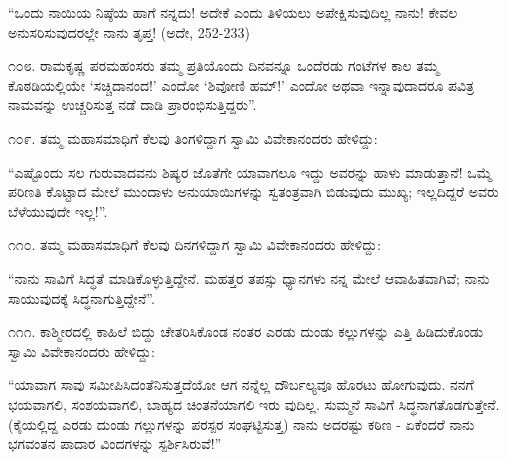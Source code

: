 “ಒಂದು ನಾಯಿಯ ನಿಷ್ಠೆಯ ಹಾಗೆ ನನ್ನದು! ಅದೇಕೆ ಎಂದು ತಿಳಿಯಲು ಅಪೇಕ್ಷಿಸುವುದಿಲ್ಲ ನಾನು! ಕೇವಲ ಅನುಸರಿಸುವುದರಲ್ಲೇ ನಾನು ತೃಪ್ತ! (ಅದೇ, 252-233)

೧೦೮. ರಾಮಕೃಷ್ಣ ಪರಮಹಂಸರು ತಮ್ಮ ಪ್ರತಿಯೊಂದು ದಿನವನ್ನೂ ಒಂದೆರಡು ಗಂಟೆಗಳ ಕಾಲ ತಮ್ಮ ಕೊಠಡಿಯಲ್ಲಿಯೇ ‘ಸಚ್ಚಿದಾನಂದ!’ ಎಂದೋ ‘ಶಿವೋಣಿ ಹಮ್​!’ ಎಂದೋ ಅಥವಾ ಇನ್ನಾವುದಾದರೂ ಪವಿತ್ರ ನಾಮವನ್ನು ಉಚ್ಚರಿಸುತ್ತ ನಡೆ ದಾಡಿ ಪ್ರಾರಂಭಿಸುತ್ತಿದ್ದರು”. 

೧೦೯. ತಮ್ಮ ಮಹಾಸಮಾಧಿಗೆ ಕೆಲವು ತಿಂಗಳಿದ್ದಾಗ ಸ್ವಾಮಿ ವಿವೇಕಾನಂದರು ಹೇಳಿದ್ದು:

“ಎಷ್ಟೊಂದು ಸಲ ಗುರುವಾದವನು ಶಿಷ್ಯರ ಜೊತೆಗೇ ಯಾವಾಗಲೂ ಇದ್ದು ಅವರನ್ನು ಹಾಳು ಮಾಡುತ್ತಾನೆ! ಒಮ್ಮೆ ಪರಿಣತಿ ಕೊಟ್ಟಾದ ಮೇಲೆ ಮುಂದಾಳು ಅನುಯಾಯಿಗಳನ್ನು ಸ್ವತಂತ್ರವಾಗಿ ಬಿಡುವುದು ಮುಖ್ಯ; ಇಲ್ಲದಿದ್ದರೆ ಅವರು ಬೆಳೆಯುವುದೇ ಇಲ್ಲ!”. 

೧೧೦. ತಮ್ಮ ಮಹಾಸಮಾಧಿಗೆ ಕೆಲವು ದಿನಗಳಿದ್ದಾಗ ಸ್ವಾಮಿ ವಿವೇಕಾನಂದರು ಹೇಳಿದ್ದು:

“ನಾನು ಸಾವಿಗೆ ಸಿದ್ಧತೆ ಮಾಡಿಕೊಳ್ಳುತ್ತಿದ್ದೇನೆ. ಮಹತ್ತರ ತಪಸ್ಸು ಧ್ಯಾನಗಳು ನನ್ನ ಮೇಲೆ ಆವಾಹಿತವಾಗಿವೆ; ನಾನು ಸಾಯುವುದಕ್ಕೆ ಸಿದ್ಧನಾಗುತ್ತಿದ್ದೇನೆ”. 

೧೧೧. ಕಾಶ್ಮೀರದಲ್ಲಿ ಕಾಹಿಲೆ ಬಿದ್ದು ಚೇತರಿಸಿಕೊಂಡ ನಂತರ ಎರಡು ದುಂಡು ಕಲ್ಲುಗಳನ್ನು ಎತ್ತಿ ಹಿಡಿದುಕೊಂಡು ಸ್ವಾಮಿ ವಿವೇಕಾನಂದರು ಹೇಳಿದ್ದು:

“ಯಾವಾಗ ಸಾವು ಸಮೀಪಿಸಿದಂತೆನಿಸುತ್ತದೆಯೋ ಆಗ ನನ್ನೆಲ್ಲ ದೌರ್ಬಲ್ಯವೂ ಹೊರಟು ಹೋಗುವುದು. ನನಗೆ ಭಯವಾಗಲಿ, ಸಂಶಯವಾಗಲಿ, ಬಾಹ್ಯದ ಚಿಂತನೆಯಾಗಲಿ ಇರು ವುದಿಲ್ಲ. ಸುಮ್ಮನೆ ಸಾವಿಗೆ ಸಿದ್ಧನಾಗತೊಡಗುತ್ತೇನೆ. (ಕೈಯಲ್ಲಿದ್ದ ಎರಡು ದುಂಡು ಗಲ್ಲುಗಳನ್ನು ಪರಸ್ಪರ ಸಂಘಟ್ಟಿಸುತ್ತ) ನಾನು ಅದರಷ್ಟು ಕಠಿಣ - ಏಕೆಂದರೆ ನಾನು ಭಗವಂತನ ಪಾದಾರ ವಿಂದಗಳನ್ನು ಸ್ಪರ್ಶಿಸಿರುವೆ!” 


